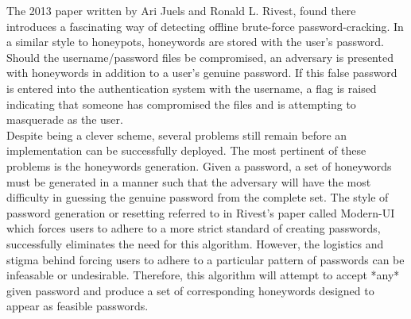 The 2013 paper written by Ari Juels and Ronald L. Rivest, found  there%
introduces a fascinating way of detecting offline brute-force password-cracking. In a similar style to honeypots, honeywords are stored with the user's password. Should the username/password files be compromised, an adversary is presented with honeywords in addition to a user's genuine password. If this false password is entered into the authentication system with the username, a flag is raised indicating that someone has compromised the files and is attempting to masquerade as the user. \\

Despite being a clever scheme, several problems still remain before an implementation can be successfully deployed. The most pertinent of these problems is the honeywords generation. Given a password, a set of honeywords must be generated in a manner such that the adversary will have the most difficulty in guessing the genuine password from the complete set. The style of password generation or resetting referred to in Rivest's paper called Modern-UI which forces users to adhere to a more strict standard of creating passwords, successfully eliminates the need for this algorithm. However, the logistics and stigma behind forcing users to adhere to a particular pattern of passwords can be infeasable or undesirable. Therefore, this algorithm will attempt to accept *any* given password and produce a set of corresponding honeywords designed to appear as feasible passwords.\\




